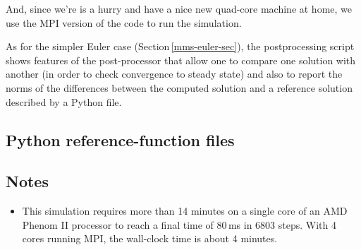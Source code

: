 \noindent
And, since we're is a hurry and have a nice new quad-core machine at home,
we use the MPI version of the code to run the simulation.\\
\topbar

\bottombar

\noindent
As for the simpler Euler case (Section\,\ref{mms-euler-sec}),
the postprocessing script shows features of the post-processor that allow
one to compare one solution with another (in order to check convergence to steady state)
and also to report the norms of the differences between the computed solution and 
a reference solution described by a Python file.

\noindent
\topbar

\bottombar

\newpage
\subsection{Python reference-function files}
\topbar

\bottombar

\newpage
\topbar

\bottombar

\subsection{Notes}
\begin{itemize}
\item This simulation requires more than 14 minutes on a single core of 
  an AMD Phenom II processor to reach a final time of 80\,ms in 6803 steps.
  With 4 cores running MPI, the wall-clock time is about 4 minutes.
\end{itemize}
